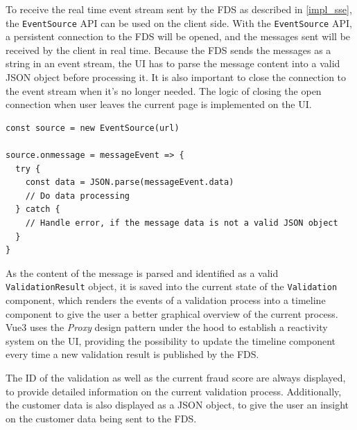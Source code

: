     To receive the real time event stream sent by the FDS as described in \autoref{impl_sse}, the \verb;EventSource; API can be used on the client side. With the \verb;EventSource; API, a persistent connection to the FDS will be opened, and the messages sent will be received by the client in real time. Because the FDS sends the messages as a string in an event stream, the UI has to parse the message content into a valid JSON object before processing it. It is also important to close the connection to the event stream when it's no longer needed. The logic of closing the open connection when user leaves the current page is implemented on the UI. 

    \begin{lstlisting}[style=es6, caption={Using the EventSource API in the browser (TypeScript)}]
const source = new EventSource(url)

source.onmessage = messageEvent => {
  try {
    const data = JSON.parse(messageEvent.data)
    // Do data processing
  } catch {
    // Handle error, if the message data is not a valid JSON object
  }
}
    \end{lstlisting}

    As the content of the message is parsed and identified as a valid \verb;ValidationResult; object, it is saved into the current state of the \verb;Validation; component, which renders the events of a validation process into a timeline component to give the user a better graphical overview of the current process. Vue3 uses the \emph{Proxy}\autocite[pp. 207-217]{gamma-1995} design pattern under the hood to establish a reactivity system on the UI, providing the possibility to update the timeline component every time a new validation result is published by the FDS. 

    The ID of the validation as well as the current fraud score are always displayed, to provide detailed information on the current validation process. Additionally, the customer data is also displayed as a JSON object, to give the user an insight on the customer data being sent to the FDS. 

